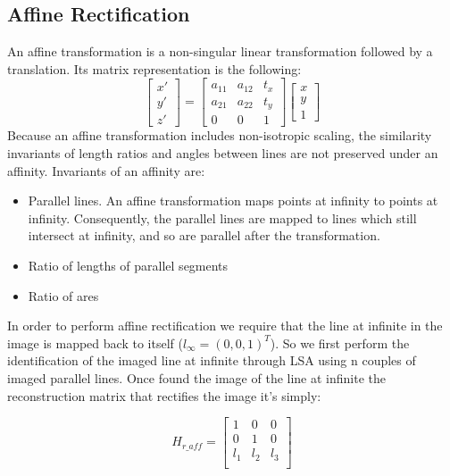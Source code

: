 \documentclass[11pt, oneside]{article}   	%
\begin{document}
\subsection{Affine Rectification}
An affine transformation is a non-singular linear transformation followed by a translation.
Its matrix representation is the following:
\begin{equation}
\begin{bmatrix}
x' \\ y' \\ z' 
\end{bmatrix}
= 
\begin{bmatrix}
a_{11} & a_{12} & t_x \\ a_{21} & a_{22} & t_y  \\ 0 & 0 & 1
\end{bmatrix}
\begin{bmatrix}
x \\ y \\ 1
\end{bmatrix}
\end{equation}
Because an affine transformation includes non-isotropic scaling, the similarity invariants of length ratios and angles between lines are not preserved under an affinity.
Invariants of an affinity are:
\begin{itemize}
\item Parallel lines. An affine transformation maps points at infinity to points  at infinity. Consequently, the parallel lines are mapped to lines which still intersect at infinity, and so are parallel after the transformation.
\item Ratio of lengths of parallel segments
\item Ratio of ares
\end{itemize}

In order to perform affine rectification we require that the line at infinite in the image is mapped back to itself ($l_{\infty} = (0,0,1)^{T}$).
So we first perform the identification of the imaged line at infinite through LSA using n couples of imaged parallel lines. 
Once found the image of the line at infinite the reconstruction matrix that rectifies the image it's simply:

\begin{equation}
H_{r\_aff} =\begin{bmatrix} 
1& 0 & 0 \\
0 &  1 & 0 \\
l_1 &  l_2 & l_3 \\
\end{bmatrix}
\end{equation}
\end{document}
